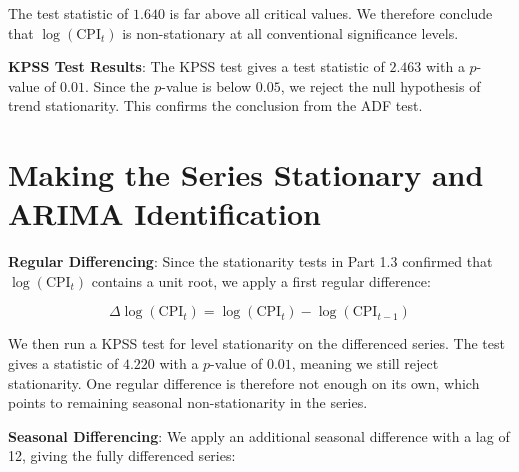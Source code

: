 The test statistic of $1.640$ is far above all critical values. 
We therefore conclude that $\log(\text{CPI}_t)$ is non-stationary at all conventional significance levels.

\textbf{KPSS Test Results}: The KPSS test gives a test statistic of $2.463$ with a $p$-value of $0.01$. Since the $p$-value is below $0.05$, we reject the null hypothesis of trend stationarity. This confirms the conclusion from the ADF test.







\section{Making the Series Stationary and ARIMA Identification} \lab

\textbf{Regular Differencing}: Since the stationarity tests in Part 1.3 confirmed that $\log(\text{CPI}_t)$ contains a unit root, we apply a first regular difference:

\[
\Delta \log(\text{CPI}_t) = \log(\text{CPI}_t) - \log(\text{CPI}_{t-1})
\]

We then run a KPSS test for level stationarity on the differenced series. The test gives a statistic of $4.220$ with a $p$-value of $0.01$, meaning we still reject stationarity. One regular difference is therefore not enough on its own, which points to remaining seasonal non-stationarity in the series.

\textbf{Seasonal Differencing}: We apply an additional seasonal difference with a lag of 12, giving the fully differenced series:

